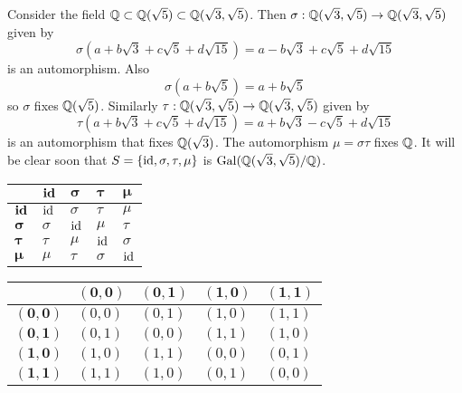 \begin{example}\label{example-galois-group-of-Q-sqrt3-sqrt5-over-Q}
    Consider the field $\mathbb{Q} \subset \mathbb{Q}(\sqrt5) \subset \mathbb{Q}(\sqrt3, \sqrt5)$. Then $\sigma: \mathbb{Q}(\sqrt3,\sqrt5)\to\mathbb{Q}(\sqrt3,\sqrt5)$ given by
    \[
        \sigma(a + b\sqrt3 + c\sqrt5 + d\sqrt{15}) = a - b\sqrt3 + c\sqrt5 + d\sqrt{15}
    \]
    is an automorphism. Also
    \[
        \sigma(a + b\sqrt{5}) = a+b\sqrt5
    \]
    so $\sigma$ fixes $\mathbb{Q}(\sqrt5)$. Similarly $\tau: \mathbb{Q}(\sqrt3,\sqrt5)\to\mathbb{Q}(\sqrt3,\sqrt5)$ given by
    \[
        \tau(a + b\sqrt3 + c\sqrt5 + d\sqrt{15}) = a + b\sqrt3 - c\sqrt5 + d\sqrt{15}
    \]
    is an automorphism that fixes $\mathbb{Q}(\sqrt3)$. The automorphism $\mu = \sigma\tau$ fixes $\mathbb{Q}$. It will be clear soon that $S = \{\mathrm{id}, \sigma, \tau, \mu\}$ is $\mathrm{Gal}(\mathbb{Q}(\sqrt3,\sqrt5)/\mathbb{Q})$.

    \begin{minipage}[c]{0.475\textwidth}
        \begin{table}[H]
            \centering
            \begin{tabular}{|l|l|l|l|l|}
                \hline
                & $\boldsymbol{\mathrm{id}}$ & $\boldsymbol{\sigma}$ & $\boldsymbol{\tau}$ & $\boldsymbol{\mu}$ \\ \hline
                $\boldsymbol{\mathrm{id}}$ & $\mathrm{id}$ & $\sigma$ & $\tau$ & $\mu$ \\ \hline
                $\boldsymbol{\sigma}$ & $\sigma$ & $\mathrm{id}$ & $\mu$ & $\tau$ \\ \hline
                $\boldsymbol{\tau}$ & $\tau$ & $\mu$ & $\mathrm{id}$ & $\sigma$ \\ \hline
                $\boldsymbol{\mu}$ & $\mu$ & $\tau$ & $\sigma$ & $\mathrm{id}$ \\ \hline
            \end{tabular}
        \end{table}
    \end{minipage}
    \begin{minipage}[c]{0.475\textwidth}
        \begin{table}[H]
            \centering
            \begin{tabular}{|l|l|l|l|l|}
                \hline
                & $\boldsymbol{(0, 0)}$ & $\boldsymbol{(0, 1)}$ & $\boldsymbol{(1, 0)}$ & $\boldsymbol{(1, 1)}$ \\ \hline
                $\boldsymbol{(0, 0)}$ & $(0, 0)$ & $(0, 1)$ & $(1, 0)$ & $(1, 1)$ \\ \hline
                $\boldsymbol{(0, 1)}$ & $(0, 1)$ & $(0, 0)$ & $(1, 1)$ & $(1, 0)$ \\ \hline
                $\boldsymbol{(1, 0)}$ & $(1, 0)$ & $(1, 1)$ & $(0, 0)$ & $(0, 1)$ \\ \hline
                $\boldsymbol{(1, 1)}$ & $(1, 1)$ & $(1, 0)$ & $(0, 1)$ & $(0, 0)$ \\ \hline
            \end{tabular}
        \end{table}
    \end{minipage}


\end{example}
